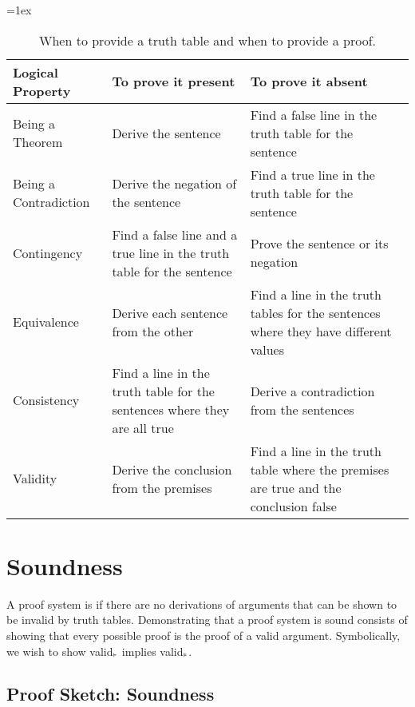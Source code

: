 \documentclass[12pt, a4paper, twoside, openright, titlepage]{book}
\begin{document}
\begin{table}[H]
\tabulinesep=1ex
\begin{tabu}{X[.5,c,m] ||X[1,l,m] |X[1,l,m]}
\textbf{Logical Property} 		&	\textbf{To prove it present} 	&	\textbf{To prove it absent} \\ \hline \hline

Being a Theorem   &	Derive the sentence & Find a false line in the truth table for the sentence	 \\ \hline
 
Being a Contradiction		&	Derive the negation of the sentence  & Find a true line in the truth table for the sentence \\ \hline

Contingency &	Find a false line and a true line in the truth table for the sentence & Prove the sentence or its negation \\ \hline

Equivalence &	Derive each sentence from the other & Find a line in the truth tables for the sentences where they have different values	\\ \hline

Consistency &	Find a line in the truth table for the sentences where they are all true	& Derive a contradiction from the sentences \\ \hline

Validity	&	Derive the conclusion from the premises & Find a line in the truth table where the premises are true and the conclusion false \\ 
\end{tabu}
\caption{When to provide a truth table and when to provide a proof.}
\label{table:prove_present_or_absent}
\end{table}



\section{\textsection Soundness}

\begin{defn}{}{}
    A proof system is  if there are no derivations of arguments that can be shown to be invalid by truth tables. Demonstrating that a proof system is sound consists of showing that every possible proof is the proof of a valid argument. Symbolically, we wish to show valid$_{\vdash}$ implies valid$_{\vDash}$.
\end{defn}


\subsection{\textsection Proof Sketch: Soundness}
\end{document}
